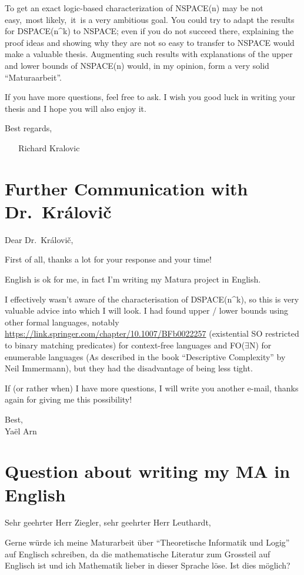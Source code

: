 To get an exact logic-based characterization of NSPACE(n) may be not
easy,~most likely,~it~is a very ambitious goal. You could try to adapt
the results for DSPACE(n\^{}k) to NSPACE; even if you do not succeed
there, explaining the proof ideas and showing why they are not so easy
to transfer to NSPACE would make a valuable thesis. Augmenting such
results with explanations of the upper and lower bounds of NSPACE(n)
would, in my opinion, form a very solid ``Maturaarbeit''.

If you have more questions, feel free to ask. I wish you good luck in
writing your thesis and I hope you will also enjoy it.

Best regards,

~ ~ Richard Kralovic

\section{Further Communication with
Dr.~Královi\v{c}}\label{further-communication-with-dr.-kruxe1loviux10d}

Dear Dr.~Královi\v{c},

First of all, thanks a lot for your response and your time!

English is ok for me, in fact I'm writing my Matura project in English.

I effectively wasn't aware of the characterisation of DSPACE(n\^{}k), so
this is very valuable advice into which I will look. I had found upper /
lower bounds using other formal languages, notably
\url{https://link.springer.com/chapter/10.1007/BFb0022257} (existential
SO restricted to binary matching predicates) for context-free languages
and \acs{FO}($\exists$N) for enumerable languages (As described in the book
``Descriptive Complexity'' by Neil Immermann), but they had the
disadvantage of being less tight.

If (or rather when) I have more questions, I will write you another
e-mail, thanks again for giving me this possibility!

Best,\\
Yaël Arn

\section{Question about writing my MA in
English}\label{question-for-writing-ma-in-english}


Sehr geehrter Herr Ziegler, sehr geehrter Herr Leuthardt,

\sloppy Gerne würde ich meine Maturarbeit über ``Theoretische Informatik und
Logig'' auf Englisch schreiben, da die mathematische Literatur zum
Grossteil auf Englisch ist und ich Mathematik lieber in dieser Sprache
löse. Ist dies möglich?

